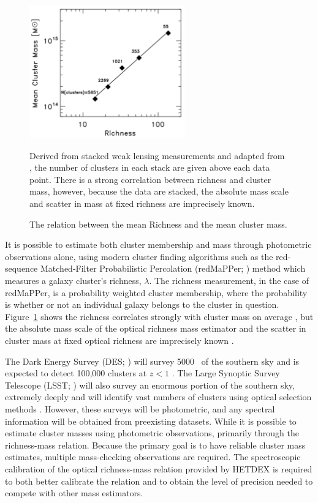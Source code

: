 \begin{figure}[t]
	\begin{center}
		\includegraphics[width=0.6\textwidth]{figures/massrichness.pdf}
	\end{center}
	\caption{The relation between the mean Richness and the mean cluster mass.} 
	Derived from stacked weak lensing measurements and adapted from \citealt{Rozo2010}, the number of clusters in each stack are given above each data point. There is a strong correlation between richness and cluster mass, however, because the data are stacked, the absolute mass scale and scatter in mass at fixed richness are imprecisely known.
	\label{fig:massrichness}
\end{figure}

It is possible to estimate both cluster membership and mass through photometric observations alone, using modern cluster finding algorithms such as the red-sequence Matched-Filter Probabilistic Percolation (redMaPPer; \citealt{Rykoff2014}) method which measures a galaxy cluster's richness, $\lambda$. The richness measurement, in the case of redMaPPer, is a probability weighted cluster membership, where the probability is whether or not an individual galaxy belongs to the cluster in question. Figure~\ref{fig:massrichness} shows the richness correlates strongly with cluster mass on average , but the absolute mass scale of the optical richness mass estimator and the scatter in cluster mass at fixed optical richness are imprecisely known \citep{Rykoff2012}.

The Dark Energy Survey (DES; \citealt{DES2005}) will survey 5000 \degsq\ of the southern sky and is expected to detect 100,000 clusters at $z<1$ \citep{DarkEnergySurveyCollaboration2016}. The Large Synoptic Survey Telescope (LSST; \citealt{LSST2012}) will also survey an enormous portion of the southern sky, extremely deeply and will identify vast numbers of clusters using optical selection methods . However, these surveys will be photometric, and any spectral information will be obtained from preexisting datasets. While it is possible to estimate cluster masses using photometric observations, primarily through the richness-mass relation. Because the primary goal is to have reliable cluster mass estimates, multiple mass-checking observations are required. The spectroscopic calibration of the optical richness-mass relation provided by HETDEX is required to both better calibrate the relation and to obtain the level of precision needed to compete with other mass estimators.


